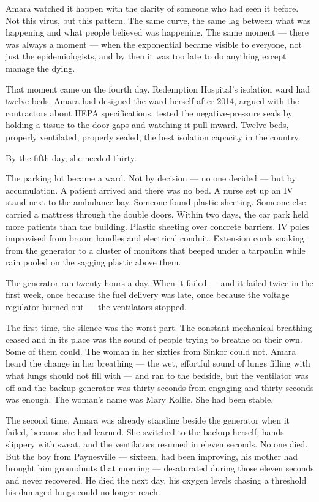 \documentclass[11pt]{article}
\begin{document}
Amara watched it happen with the clarity of someone who had seen it before. Not this virus, but this pattern. The same curve, the same lag between what was happening and what people believed was happening. The same moment --- there was always a moment --- when the exponential became visible to everyone, not just the epidemiologists, and by then it was too late to do anything except manage the dying.

That moment came on the fourth day. Redemption Hospital's isolation ward had twelve beds. Amara had designed the ward herself after 2014, argued with the contractors about HEPA specifications, tested the negative-pressure seals by holding a tissue to the door gaps and watching it pull inward. Twelve beds, properly ventilated, properly sealed, the best isolation capacity in the country.

By the fifth day, she needed thirty.

The parking lot became a ward. Not by decision --- no one decided --- but by accumulation. A patient arrived and there was no bed. A nurse set up an IV stand next to the ambulance bay. Someone found plastic sheeting. Someone else carried a mattress through the double doors. Within two days, the car park held more patients than the building. Plastic sheeting over concrete barriers. IV poles improvised from broom handles and electrical conduit. Extension cords snaking from the generator to a cluster of monitors that beeped under a tarpaulin while rain pooled on the sagging plastic above them.

The generator ran twenty hours a day. When it failed --- and it failed twice in the first week, once because the fuel delivery was late, once because the voltage regulator burned out --- the ventilators stopped.

The first time, the silence was the worst part. The constant mechanical breathing ceased and in its place was the sound of people trying to breathe on their own. Some of them could. The woman in her sixties from Sinkor could not. Amara heard the change in her breathing --- the wet, effortful sound of lungs filling with what lungs should not fill with --- and ran to the bedside, but the ventilator was off and the backup generator was thirty seconds from engaging and thirty seconds was enough. The woman's name was Mary Kollie. She had been stable.

The second time, Amara was already standing beside the generator when it failed, because she had learned. She switched to the backup herself, hands slippery with sweat, and the ventilators resumed in eleven seconds. No one died. But the boy from Paynesville --- sixteen, had been improving, his mother had brought him groundnuts that morning --- desaturated during those eleven seconds and never recovered. He died the next day, his oxygen levels chasing a threshold his damaged lungs could no longer reach.
\end{document}

